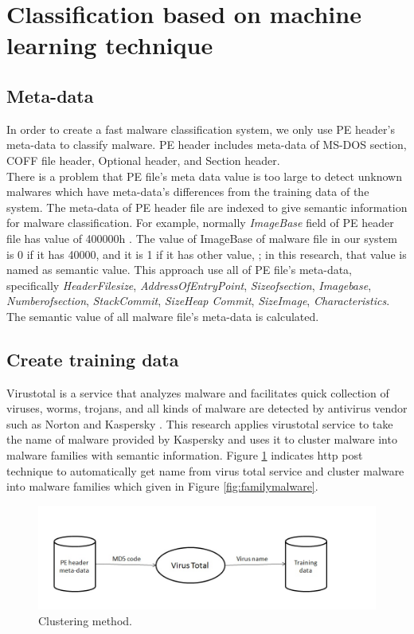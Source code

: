 \section{Classification based on machine learning technique} 
\subsection{Meta-data}
In order to create a fast malware classification system, we only use PE header's meta-data to classify malware. PE header includes meta-data of MS-DOS section, COFF file header, Optional header, and Section header.\\
There is a problem that PE file's meta data value is too large to detect unknown malwares which have meta-data's differences from the training data of the system. The meta-data of PE header file are indexed to give semantic information for malware classification. For example, normally \emph{ImageBase} field of PE header file has value of 400000h \cite{goppit}. The value of ImageBase of malware file in our system is 0 if it has 40000, and it is 1 if it has other value, ; in this research, that value is named as semantic value. This approach use all of PE file's meta-data, specifically \emph{HeaderFilesize}, \emph{AddressOfEntryPoint}, \emph{Sizeofsection}, \emph{Imagebase}, \emph{Numberofsection}, \emph{StackCommit}, \emph{SizeHeap Commit}, \emph{SizeImage}, \emph{Characteristics}. The semantic value of all malware file's meta-data is calculated.

\subsection{Create training data}
Virustotal is a service that analyzes malware and facilitates quick collection of viruses, worms, trojans, and all kinds of malware are detected by antivirus vendor such as Norton and Kaspersky \cite{virustotal}. This research applies virustotal service to take the name of malware provided by Kaspersky and uses it to  cluster malware into malware families with semantic information. 
Figure \ref{fig:clustering} indicates http post technique to automatically get name from virus total service and cluster malware into malware families which given in Figure \ref{fig:familymalware}.
\begin{figure}[h!]
\centering
\includegraphics[width=1\textwidth]{graph/clustering.jpg}
\caption{Clustering method.}
\label{fig:clustering}
\end{figure}
\newline
